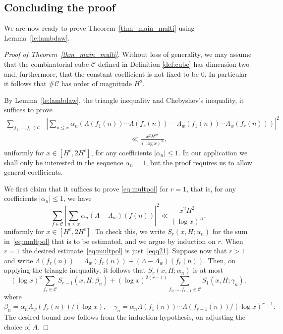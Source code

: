 \documentclass[11pt,letterpaper]{amsart}
\renewcommand{\leq}{\leqslant}
\theoremstyle{definition}
\numberwithin{equation}{section}
\newcommand{\0}{\mathbf{0}}
\begin{document}
\subsection{Concluding the proof}



We are now ready to prove Theorem~\ref{thm_main_multi} using Lemma~\ref{le:lambdaw}. 


\begin{proof}[Proof of Theorem~\ref{thm_main_multi}] Without loss of generality, we may assume that the combinatorial cube $\mathcal{C}$ defined in Definition \ref{def:cube} has  
dimension two and, furthermore, that the  constant coefficient is not fixed to be $0$. 
In particular it follows that $\#\mathcal{C}$ has order of magnitude $H^2$.

By Lemma~\ref{le:lambdaw}, the triangle inequality and Chebyshev's inequality, it suffices to prove
\begin{equation}\label{eq:multpol}
\begin{split}
\sum_{f_1,\dots,f_r\in \mathscr{C}}
&\left|\sum_{n\leq x}
\alpha_n\left(\Lambda(f_1(n))\cdots \Lambda(f_r(n))-\Lambda_{w}(f_1(n))\cdots
\Lambda_{w}(f_r(n))\right)
\right|^2\\
&\qquad\qquad\qquad\qquad\qquad \qquad \ll
\frac{x^2H^{2r}}{(\log x)^{A}},
\end{split}\end{equation}
uniformly for $x\in [H^{c},2H^{c}]$, for any 
coefficients $|\alpha_n|\leq 1$. In our application we shall only be interested in the sequence $\alpha_n=1$, but  the proof requires us to allow general coefficients. 

We first claim that it suffices to prove \eqref{eq:multpol} for $r=1$, that is, for any coefficients $|\alpha_n|\leq 1$, we have
\begin{equation}\label{eqq21}
\sum_{f\in \mathscr{C}}\left|\sum_{n\leq x}
\alpha_n(\Lambda-\Lambda_{w})(f(n))\right|^2\ll \frac{x^2H^2}{(\log x)^{A}},
\end{equation}
uniformly for $x\in [H^{c},2H^{c}]$. To check this, we write  
$S_r(x,H;\alpha_n)$ for the sum in~\eqref{eq:multpol} that is to be estimated, and we argue by induction on $r$. 
When $r=1$ the desired estimate~\eqref{eq:multpol} is just~\eqref{eqq21}.
Suppose now that $r>1$ and write
$\Lambda(f_r(n))=\Lambda_w(f_r(n))+(\Lambda-\Lambda_w)(f_r(n))$.
Then, on applying the triangle inequality, it follows that $S_r(x,H;\alpha_n)$ is at most
$$
(\log x)^2 \sum_{f_r\in \mathscr{C}} 
 S_{r-1}(x,H;\beta_n)
+(\log x)^{2(r-1)}\sum_{f_1,\dots,f_{r-1}\in \mathscr{C}} S_1(x,H;\gamma_n),
$$
where 
$$
\beta_n = \alpha_n\Lambda_w(f_{r}(n))/(\log x),\quad 
\gamma_n=\alpha_n\Lambda(f_1(n))\cdots \Lambda(f_{r-1}(n))/(\log x)^{r-1}.
$$
The desired bound now follows from the induction hypothesis,  on adjusting the choice of $A$.


\end{proof}
\end{document}
